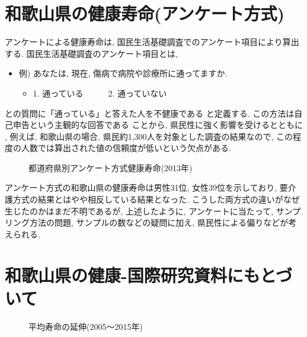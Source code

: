 \section{和歌山県の健康寿命(アンケート方式)}
アンケートによる健康寿命は,
国民生活基礎調査でのアンケート項目により算出する.
国民生活基礎調査のアンケート項目とは,

\begin{itemize} \setlength{\itemsep}{-0.5mm} \setlength{\parskip}{-0.5mm}
	\item  例) あなたは, 現在, 傷病で病院や診療所に通ってますか.
	      \begin{itemize} \setlength{\itemsep}{-0.5mm} \setlength{\parskip}{-0.5mm}
		      \item 1. 通っている~~~~~~2. 通っていない
	      \end{itemize}
\end{itemize}
との質問に「通っている」と答えた人を不健康である
と定義する.
この方法は自己申告という主観的な回答である
ことから, 県民性に強く影響を受けるとともに
, 例えば, 和歌山県の場合, 県民約1,300人を対象とした調査の結果なので, この程度の人数では算出された値の信頼度が低いという欠点がある.

\begin{figure}[h!]
	\begin{center}
		\caption{都道府県別アンケート方式健康寿命(2013年)}\label{fig1}
	\end{center}
\end{figure}

アンケート方式の和歌山県の健康寿命は男性31位, 女性39位を示しており, 要介護方式の結果とはやや相反している結果となった.
こうした両方式の違いがなぜ生じたのかはまだ不明であるが, 上述したように, アンケートに当たって, サンプリング方法の問題,
サンプルの数などの疑問に加え, 県民性による偏りなどが考えられる.
\section{和歌山県の健康-国際研究資料にもとづいて}
\begin{figure}[h!]
	\begin{center}
		\caption{平均寿命の延伸(2005〜2015年)}\label{fig10}
	\end{center}
\end{figure}

